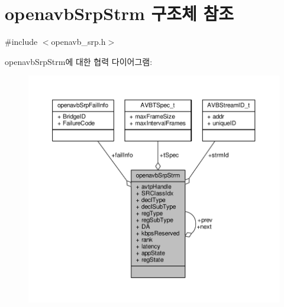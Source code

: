 \hypertarget{structopenavb_srp_strm}{}\section{openavb\+Srp\+Strm 구조체 참조}
\label{structopenavb_srp_strm}


{\ttfamily \#include $<$openavb\+\_\+srp.\+h$>$}



openavb\+Srp\+Strm에 대한 협력 다이어그램\+:
\nopagebreak
\begin{figure}[H]
\begin{center}
\leavevmode
\includegraphics[width=350pt]{structopenavb_srp_strm__coll__graph}
\end{center}
\end{figure}
